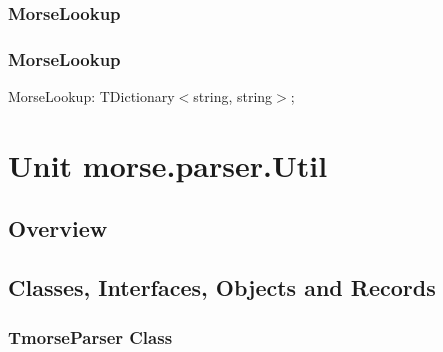 \documentclass{report}
\newif\ifpdf
\begin{document}
\subsection*{\large{\textbf{MorseLookup}}\normalsize\hspace{1ex}\hrulefill}
\else
\subsection*{MorseLookup}
\fi
\label{morse.dictionary.util-MorseLookup}
\begin{list}{}{
\setlength{\itemindent}{0cm}
\setlength{\listparindent}{0cm}
\setlength{\leftmargin}{\evensidemargin}
\addtolength{\leftmargin}{\tmplength}
\settowidth{\labelsep}{X}
\addtolength{\leftmargin}{\labelsep}
\setlength{\labelwidth}{\tmplength}
}
\item[\textbf{Declaration}\hfill]
\ifpdf
\begin{flushleft}
\fi
\begin{ttfamily}
MorseLookup: TDictionary{$<$}string, string{$>$};\end{ttfamily}

\ifpdf
\end{flushleft}
\fi

\end{list}
\chapter{Unit morse.parser.Util}
\label{morse.parser.Util}
\section{Overview}
\begin{description}
\item[\texttt{\begin{ttfamily}TmorseParser\end{ttfamily} Class}]
\end{description}
\section{Classes, Interfaces, Objects and Records}
\ifpdf
\subsection*{\large{\textbf{TmorseParser Class}}\normalsize\hspace{1ex}\hrulefill}
\else
\end{document}
